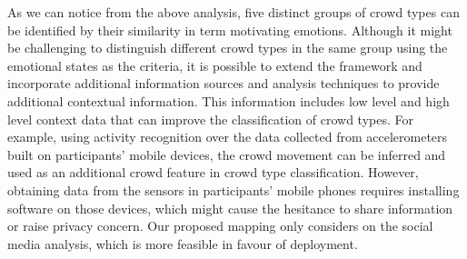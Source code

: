 As we can notice from the above analysis, five distinct groups of crowd types can be identified by their similarity in term motivating emotions. Although it might be challenging to distinguish different crowd types in the same group using the emotional states as the criteria, it is possible to extend the framework and incorporate additional information sources and analysis techniques to provide additional contextual information. This information includes low level and high level context data that can improve the classification of crowd types. For example, using activity recognition over the data collected from accelerometers built on participants' mobile devices, the crowd movement can be inferred and used as an additional crowd feature in crowd type classification. However, obtaining data from the sensors in participants' mobile phones requires installing software on those devices, which might cause the hesitance to share information or raise privacy concern. Our proposed mapping only considers on the social media analysis, which is more feasible in favour of deployment.


